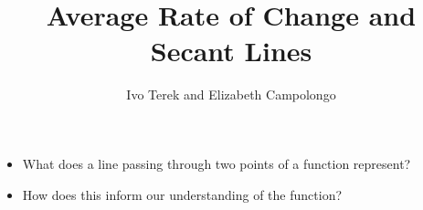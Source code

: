 \documentclass{ximera}
\author{Ivo Terek and Elizabeth Campolongo}
\title{Average Rate of Change and Secant Lines}
\begin{document}
\begin{abstract}
\end{abstract}
\maketitle
%
%
%
\begin{motivatingQuestions}\begin{itemize}
\item What does a line passing through two points of a function represent?
\item How does this inform our understanding of the function?
\end{itemize}\end{motivatingQuestions}
%
%
%
\end{document}
